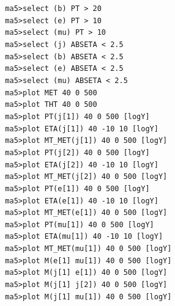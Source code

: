 \documentclass[a4paper, 10pt]{article}
\begin{document}
\texttt{ }\texttt{ }\texttt{ma5>select (b)  PT > 20\\
}
\texttt{ }\texttt{ }\texttt{ma5>select (e)  PT > 10\\
}
\texttt{ }\texttt{ }\texttt{ma5>select (mu) PT > 10\\
}
\texttt{ }\texttt{ }\texttt{ma5>select (j)  ABSETA < 2.5\\
}
\texttt{ }\texttt{ }\texttt{ma5>select (b)  ABSETA < 2.5\\
}
\texttt{ }\texttt{ }\texttt{ma5>select (e)  ABSETA < 2.5\\
}
\texttt{ }\texttt{ }\texttt{ma5>select (mu) ABSETA < 2.5\\
}
\texttt{ }\texttt{ }\texttt{ma5>plot MET 40 0 500\\
}
\texttt{ }\texttt{ }\texttt{ma5>plot THT 40 0 500\\
}
\texttt{ }\texttt{ }\texttt{ma5>plot PT(j[1]) 40 0 500 [logY]\\
}
\texttt{ }\texttt{ }\texttt{ma5>plot ETA(j[1]) 40 -10 10 [logY]\\
}
\texttt{ }\texttt{ }\texttt{ma5>plot MT\_MET(j[1]) 40 0 500 [logY]\\
}
\texttt{ }\texttt{ }\texttt{ma5>plot PT(j[2]) 40 0 500 [logY]\\
}
\texttt{ }\texttt{ }\texttt{ma5>plot ETA(j[2]) 40 -10 10 [logY]\\
}
\texttt{ }\texttt{ }\texttt{ma5>plot MT\_MET(j[2]) 40 0 500 [logY]\\
}
\texttt{ }\texttt{ }\texttt{ma5>plot PT(e[1]) 40 0 500 [logY]\\
}
\texttt{ }\texttt{ }\texttt{ma5>plot ETA(e[1]) 40 -10 10 [logY]\\
}
\texttt{ }\texttt{ }\texttt{ma5>plot MT\_MET(e[1]) 40 0 500 [logY]\\
}
\texttt{ }\texttt{ }\texttt{ma5>plot PT(mu[1]) 40 0 500 [logY]\\
}
\texttt{ }\texttt{ }\texttt{ma5>plot ETA(mu[1]) 40 -10 10 [logY]\\
}
\texttt{ }\texttt{ }\texttt{ma5>plot MT\_MET(mu[1]) 40 0 500 [logY]\\
}
\texttt{ }\texttt{ }\texttt{ma5>plot M(e[1] mu[1]) 40 0  500 [logY]\\
}
\texttt{ }\texttt{ }\texttt{ma5>plot M(j[1] e[1]) 40 0  500 [logY]\\
}
\texttt{ }\texttt{ }\texttt{ma5>plot M(j[1] j[2]) 40 0  500 [logY]\\
}
\texttt{ }\texttt{ }\texttt{ma5>plot M(j[1] mu[1]) 40 0  500 [logY]\\
}
\end{document}
